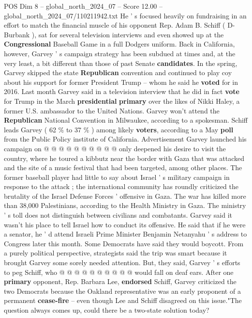 \begin{textsample}{POS Dim 8 – global\_north\_2024\_07 – Score 12.00 – global\_north\_2024\_07/110211942.txt}  \label{ex:f8_pos_044}
He ' s focused heavily on fundraising in an effort to match the financial muscle of his opponent Rep.
Adam B.
Schiff ( D-Burbank ), sat for several television interviews and even showed up at the \textbf{Congressional} Baseball Game in a full Dodgers uniform.
Back in California, however, Garvey ' s campaign strategy has been subdued at times and, at the very least, a bit different than those of past Senate \textbf{candidates}.
In the spring, Garvey skipped the state \textbf{Republican} convention and continued to play coy about his support for former President Trump -- whom he said he \textbf{voted} for in 2016.
Last month Garvey said in a television interview that he did in fact \textbf{vote} for Trump in the March \textbf{presidential} \textbf{primary} over the likes of Nikki Haley, a former U.S. ambassador to the United Nations.
Garvey won't attend the \textbf{Republican} National Convention in Milwaukee, according to a spokesman.
Schiff leads Garvey ( 62 \% to 37 \% ) among likely \textbf{voters}, according to a May \textbf{poll} from the Public Policy institute of California.
Advertisement Garvey launched his campaign on @ @ @ @ @ @ @ @ @ @ only deepened his desire to visit the country, where he toured a kibbutz near the border with Gaza that was attacked and the site of a music festival that had been targeted, among other places.
The former baseball player had little to say about Israel ' s military campaign in response to the attack ; the international community has roundly criticized the brutality of the Israel Defense Forces ' offensive in Gaza.
The war has killed more than 38,000 Palestinians, according to the Health Ministry in Gaza.
The ministry ' s toll does not distinguish between civilians and combatants.
Garvey said it wasn't his place to tell Israel how to conduct its offensive.
He said that if he were a senator, he ' d attend Israeli Prime Minister Benjamin Netanyahu ' s address to Congress later this month.
Some Democrats have said they would boycott.
From a purely political perspective, strategists said the trip was smart because it brought Garvey some sorely needed attention.
But, they said, Garvey ' s efforts to peg Schiff, who @ @ @ @ @ @ @ @ @ @ would fall on deaf ears.
After one \textbf{primary} opponent, Rep.
Barbara Lee, \textbf{endorsed} Schiff, Garvey criticized the two Democrats because the Oakland representative was an early proponent of a permanent \textbf{cease-fire} -- even though Lee and Schiff disagreed on this issue."The question always comes up, could there be a two-state solution today?

\end{textsample}
